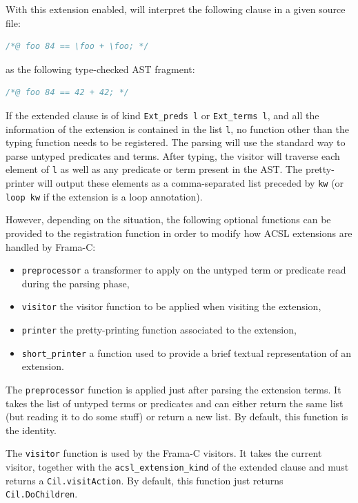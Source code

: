 
With this extension enabled, \framac will interpret the following clause in
a given source file:
\begin{lstlisting}[language=C,alsolanguage=ACSL]
/*@ foo 84 == \foo + \foo; */
\end{lstlisting}
as the following type-checked AST fragment:
\begin{lstlisting}[language=C,alsolanguage=ACSL]
/*@ foo 84 == 42 + 42; */
\end{lstlisting}

If the extended clause is of kind \verb|Ext_preds l| or \verb|Ext_terms l|,
and all the information of the extension is contained in the list \verb|l|,
no function other than the typing function needs to be registered. The parsing
will use the standard way to parse untyped predicates and terms. After
typing, the visitor will traverse each element of \verb|l| as well as any
predicate or term present in the AST. The pretty-printer will output these
elements as a comma-separated list preceded by \verb|kw| (or \verb|loop kw| if
the extension is a loop annotation).

However, depending on the situation, the following optional functions can be
provided to the registration function in order to modify how ACSL extensions
are handled by Frama-C:

\begin{itemize}
\item \texttt{preprocessor} a transformer to apply on the untyped term or
  predicate read during the parsing phase,
\item \texttt{visitor} the visitor function to be applied when visiting
  the extension,
\item \texttt{printer} the pretty-printing function associated to the
  extension,
\item \texttt{short\_printer} a function used to provide a brief textual
  representation of an extension.
\end{itemize}

The \verb|preprocessor| function is applied just after parsing the extension
terms. It takes the list of untyped terms or predicates and can either return
the same list (but reading it to do some stuff) or return a new list. By
default, this function is the identity.

The \verb|visitor| function is used by the Frama-C visitors. It takes the
current visitor, together with the \verb|acsl_extension_kind| of the extended
clause and must returns a \verb|Cil.visitAction|. By default, this function
just returns \verb|Cil.DoChildren|.

